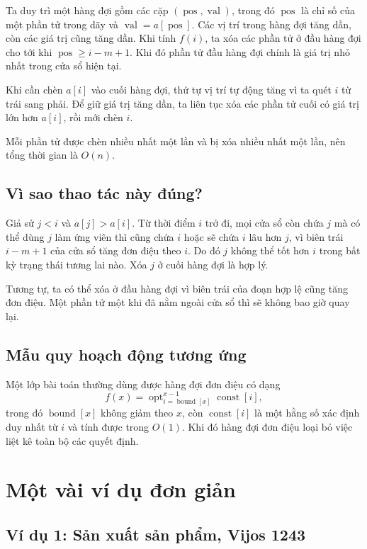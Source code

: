 \documentclass[11pt]{article}
\newcommand{\pos}{\operatorname{pos}}
\newcommand{\val}{\operatorname{val}}
\begin{document}
Ta duy trì một hàng đợi gồm các cặp $(\pos,\val)$, trong đó $\pos$ là chỉ số
của một phần tử trong dãy và $\val=a[\pos]$. Các vị trí trong hàng đợi tăng
dần, còn các giá trị cũng tăng dần. Khi tính $f(i)$, ta xóa các phần tử ở đầu
hàng đợi cho tới khi $\pos\ge i-m+1$. Khi đó phần tử đầu hàng đợi chính là
giá trị nhỏ nhất trong cửa sổ hiện tại.

Khi cần chèn $a[i]$ vào cuối hàng đợi, thứ tự vị trí tự động tăng vì ta quét
$i$ từ trái sang phải. Để giữ giá trị tăng dần, ta liên tục xóa các phần tử
cuối có giá trị lớn hơn $a[i]$, rồi mới chèn $i$.

Mỗi phần tử được chèn nhiều nhất một lần và bị xóa nhiều nhất một lần, nên
tổng thời gian là $O(n)$.

\subsection*{Vì sao thao tác này đúng?}

Giả sử $j<i$ và $a[j]>a[i]$. Từ thời điểm $i$ trở đi, mọi cửa sổ còn chứa
$j$ mà có thể dùng $j$ làm ứng viên thì cũng chứa $i$ hoặc sẽ chứa $i$ lâu
hơn $j$, vì biên trái $i-m+1$ của cửa sổ tăng đơn điệu theo $i$. Do đó $j$
không thể tốt hơn $i$ trong bất kỳ trạng thái tương lai nào. Xóa $j$ ở cuối
hàng đợi là hợp lý.

Tương tự, ta có thể xóa ở đầu hàng đợi vì biên trái của đoạn hợp lệ cũng
tăng đơn điệu. Một phần tử một khi đã nằm ngoài cửa sổ thì sẽ không bao giờ
quay lại.

\subsection*{Mẫu quy hoạch động tương ứng}

Một lớp bài toán thường dùng được hàng đợi đơn điệu có dạng
\[
  f(x)=\operatorname{opt}_{i=\operatorname{bound}[x]}^{x-1}
       \operatorname{const}[i],
\]
trong đó $\operatorname{bound}[x]$ không giảm theo $x$, còn
$\operatorname{const}[i]$ là một hằng số xác định duy nhất từ $i$ và tính
được trong $O(1)$. Khi đó hàng đợi đơn điệu loại bỏ việc liệt kê toàn bộ các
quyết định.

\section{Một vài ví dụ đơn giản}

\subsection{Ví dụ 1: Sản xuất sản phẩm, Vijos 1243}
\end{document}
